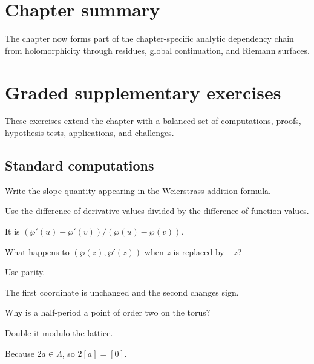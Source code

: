 \section*{Chapter summary}
The chapter now forms part of the chapter-specific analytic dependency chain from holomorphicity through residues, global continuation, and Riemann surfaces.
\section{Graded supplementary exercises}
These exercises extend the chapter with a balanced set of computations, proofs, hypothesis tests, applications, and challenges.

\subsection*{Standard computations}

\begin{exercise}\label{exr:iv30-expand-01}
Write the slope quantity appearing in the Weierstrass addition formula.
\end{exercise}
\begin{hint}
Use the difference of derivative values divided by the difference of function values.
\end{hint}
\begin{solution}
It is \((\wp'(u)-\wp'(v))/(\wp(u)-\wp(v))\).
\end{solution}

\begin{exercise}\label{exr:iv30-expand-02}
What happens to \((\wp(z),\wp'(z))\) when \(z\) is replaced by \(-z\)?
\end{exercise}
\begin{hint}
Use parity.
\end{hint}
\begin{solution}
The first coordinate is unchanged and the second changes sign.
\end{solution}

\begin{exercise}\label{exr:iv30-expand-03}
Why is a half-period a point of order two on the torus?
\end{exercise}
\begin{hint}
Double it modulo the lattice.
\end{hint}
\begin{solution}
Because \(2a\in\Lambda\), so \(2[a]=[0]\).
\end{solution}

